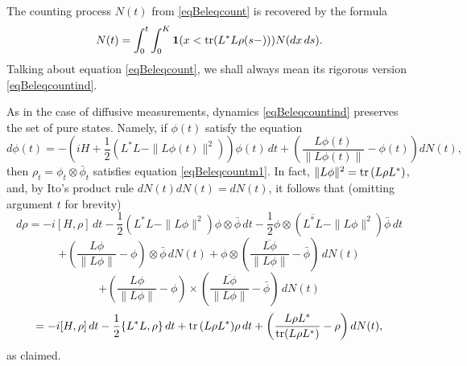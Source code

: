 \documentclass[12pt]{article}
\def\1{\mathbf{1}}
\def\tr{\rm{tr}}
\begin{document}
The counting process $N(t)$ from \eqref{eqBeleqcount} is recovered by the formula
\[
N(t)=\int_0^t \int_0^K \1(x< {\tr} (L^*L\rho(s-))) N(dx \, ds).
\]
Talking about equation \eqref{eqBeleqcount}, we shall always mean its rigorous version \eqref{eqBeleqcountind}.


As in the case of diffusive measurements, dynamics \eqref{eqBeleqcountind} preserves the set of pure states.
Namely, if $\phi(t)$ satisfy the equation
\begin{equation}
\label{eqcountpure}
d \phi(t)=-\left(iH +\frac12 (L^*L-\|L\phi(t)\|^2)\right)\phi(t) \, dt
+\left(\frac{L\phi(t)}{\|L\phi(t)\|}-\phi(t)\right)  dN(t),
\end{equation}
then $\rho_t=\phi_t\otimes \bar \phi_t$ satisfies equation \eqref{eqBeleqcountm1}.
In fact, $\|L\phi\|^2={\tr}\, (L\rho L^*)$, and,
 by Ito's product rule $dN(t)dN(t)=dN(t)$, it follows that (omitting argument $t$ for brevity)
\[
d\rho=-i[H,\rho] \, dt
-\frac12 (L^*L-\|L\phi\|^2)\phi \otimes \bar \phi\, dt
- \frac12 \phi\otimes  (\overline{L^*L}-\|L\phi\|^2)\bar \phi\, dt
\]
\[
+\left(\frac{L\phi}{\|L\phi\|}-\phi\right) \otimes \bar \phi \, dN(t)
+\phi \otimes \left(\frac{\overline{L\phi}}{\|L\phi\|}-\bar \phi\right) \, dN(t)
\]
\[
+\left(\frac{L\phi}{\|L\phi\|}-\phi\right)
\times \left(\frac{\overline{L\phi}}{\|L\phi\|}-\bar \phi\right)\, dN(t)
\]
\[
=-i[H,\rho] \, dt-\frac12 \{L^*L,\rho\} \, dt
+{\tr}\, (L\rho L^*) \rho  \, dt
+ \left(\frac{L\rho L^*}{{\tr} (L\rho L^*)}-\rho\right) dN(t),
\]
as claimed.
\end{document}
